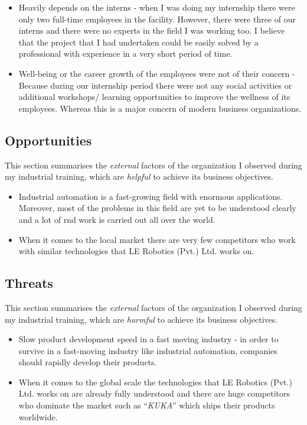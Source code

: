 \documentclass[a4paper,12pt]{report}
\begin{document}
\begin{itemize}
	\item Heavily depends on the interns - when I was doing my internship there were only two full-time employees in the facility. However, there were three of our interns and there were no experts in the field I was working too. I believe that the project that I had undertaken could be easily solved by a professional with experience in a very short period of time.
	
	\item Well-being or the career growth of the 
	employees were not of their concern - Because during our internship period there were not any social activities or additional workshops/ learning opportunities to improve the wellness of its employees. Whereas this is a major concern of modern business organizations.
	
\end{itemize}


\subsection{Opportunities}

This section summarises the \textit{external} factors of the organization I observed during my industrial training, which are \textit{helpful} to achieve its business objectives.

\begin{itemize}
	\item Industrial automation is a fast-growing field with enormous applications. Moreover, most of the problems in this field are yet to be understood clearly and a lot of \ac{rnd} work is carried out all over the world.
	
	\item When it comes to the local market there are very few competitors who work with similar technologies that LE Robotics (Pvt.) Ltd. works on.
\end{itemize}


\subsection{Threats}

This section summarises the \textit{external} factors of the organization I observed during my industrial training, which are \textit{harmful} to achieve its business objectives.

\begin{itemize}
	\item Slow product development speed in a fast 
	moving industry - in order to survive in a fast-moving industry like industrial automation, companies should rapidly develop their products.
	
	\item When it comes to the global scale the technologies that LE Robotics (Pvt.) Ltd. works on are already fully understood and there are huge competitors who dominate the market such as ``\textit{KUKA}''\cite{enwiki:kuka} which ships their products worldwide.
\end{itemize}
\end{document}
